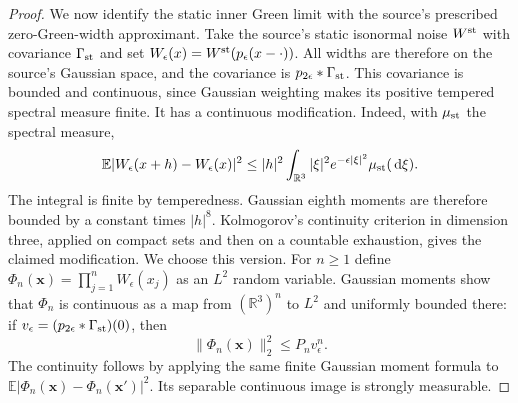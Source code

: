 \documentclass[12pt]{article}
\numberwithin{equation}{section}
\theoremstyle{definition}
\newcommand{\R}{\mathbb{R}}
\newcommand{\E}{\mathbb{E}}
\newcommand{\ud}{\,\mathrm{d}}
\begin{document}
\begin{proof}
  We now identify the static inner Green limit with the source's
  prescribed zero-Green-width approximant. Take the source's static
  isonormal noise $W^{\rm st}$ with covariance $\Gamma_{\rm st}$ and set
  $W_\epsilon(x)=W^{\rm st}(p_\epsilon(x-\cdot))$.
  All widths are therefore on the source's Gaussian space, and the
  covariance is $p_{2\epsilon}*\Gamma_{\rm st}$.
  This covariance is bounded and
  continuous, since Gaussian weighting makes its positive tempered
  spectral measure finite. It has a continuous modification. Indeed,
  with $\mu_{\rm st}$ the spectral measure,
  \[
    \E|W_\epsilon(x+h)-W_\epsilon(x)|^2
    \le |h|^2\int_{\R^3}|\xi|^2e^{-\epsilon|\xi|^2}
    \mu_{\rm st}(\ud\xi).
  \]
  The integral is finite by temperedness. Gaussian eighth moments
  are therefore bounded by a constant times $|h|^8$.
  Kolmogorov's continuity criterion in dimension three, applied on
  compact sets and then on a countable exhaustion, gives the claimed
  modification. We choose this version.
  For $n\ge1$ define
  $\Phi_n(\mathbf{x})=\prod_{j=1}^n W_\epsilon(x_j)$ as an $L^2$
  random variable. Gaussian moments show that $\Phi_n$ is continuous
  as a map from $(\R^3)^n$ to $L^2$ and uniformly bounded there:
  if $v_\epsilon=(p_{2\epsilon}*\Gamma_{\rm st})(0)$, then
  \[
    \|\Phi_n(\mathbf{x})\|_2^2\le P_n v_\epsilon^n.
  \]
  The continuity follows by applying the same finite Gaussian moment
  formula to $\E|\Phi_n(\mathbf{x})-\Phi_n(\mathbf{x}')|^2$.
  Its separable continuous image is strongly measurable.


\end{proof}
\end{document}
